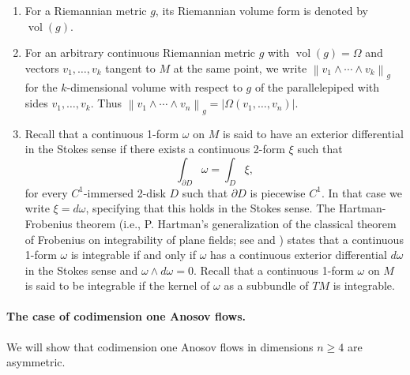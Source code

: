 \documentclass[11pt,letterpaper,reqno,abstract=true]{scrartcl}
\theoremstyle{plain}                              %
\theoremstyle{definition}                         %
\theoremstyle{remark}                             %
\newcommand{\del}{\partial}
\DeclareMathOperator{\vol}{vol}
\providecommand{\norm}[1]{\left\lVert#1\right\rVert}       %
\providecommand{\abs}[1]{\left\lvert#1\right\rvert}        %
\begin{document}
\begin{enumerate}
  \item For a Riemannian metric $g$, its Riemannian volume form is
    denoted by $\vol(g)$.
    
  \item For an arbitrary continuous Riemannian metric $g$ with
    $\vol(g) = \Omega$ and vectors $v_1, \ldots, v_k$ tangent to $M$
    at the same point, we write
    $\norm{v_1 \wedge \cdots \wedge v_k}_g$ for the $k$-dimensional
    volume with respect to $g$ of the parallelepiped with sides
    $v_1, \ldots, v_k$. Thus
    $\norm{v_1 \wedge \cdots \wedge v_n}_g = \abs{\Omega(v_1,\ldots,
      v_n)}$.

  \item Recall that a continuous 1-form $\omega$ on $M$ is said to
    have an exterior differential in the \textsf{Stokes sense} if
    there exists a continuous 2-form $\xi$ such that
    \begin{displaymath}
      \int_{\del D} \omega = \int_D \xi,
    \end{displaymath}
    for every $C^1$-immersed 2-disk $D$ such that $\del D$ is
    piecewise $C^1$. In that case we write $\xi = d\omega$, specifying
    that this holds in the Stokes sense. The Hartman-Frobenius theorem
    (i.e., P. Hartman's generalization of the classical theorem of
    Frobenius on integrability of plane fields; see \cite{plante72}
    and \cite{hart02}) states that a continuous 1-form $\omega$ is
    integrable if and only if $\omega$ has a continuous exterior
    differential $d \omega$ in the Stokes sense and
    $\omega \wedge d\omega = 0$. Recall that a continuous 1-form
    $\omega$ on $M$ is said to be integrable if the kernel of $\omega$
    as a subbundle of $TM$ is integrable.

\end{enumerate}

\paragraph{The case of codimension one Anosov flows.} We will show
that codimension one Anosov flows in dimensions $n \geq 4$ are asymmetric.
\end{document}
